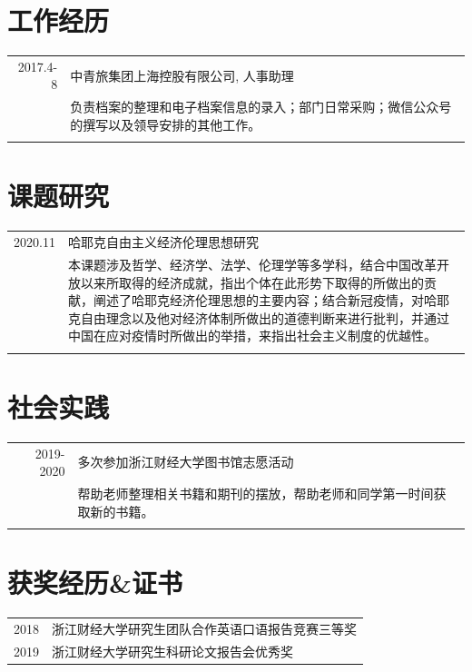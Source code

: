 \documentclass[a4paper,11pt]{article}
\begin{document}
\section{工作经历}
\begin{tabular}{r|p{11cm}}
 \textsc{2017.4-8} & 中青旅集团上海控股有限公司, 人事助理 \\&负责档案的整理和电子档案信息的录入；部门日常采购；微信公众号的撰写以及领导安排的其他工作。\\\multicolumn{2}{c}{} \\
\end{tabular}

\section{课题研究}
\begin{tabular}{r|p{11cm}}
\textsc{2020.11} & 哈耶克自由主义经济伦理思想研究\\&本课题涉及哲学、经济学、法学、伦理学等多学科，结合中国改革开放以来所取得的经济成就，指出个体在此形势下取得的所做出的贡献，阐述了哈耶克经济伦理思想的主要内容；结合新冠疫情，对哈耶克自由理念以及他对经济体制所做出的道德判断来进行批判，并通过中国在应对疫情时所做出的举措，来指出社会主义制度的优越性。\\\multicolumn{2}{c}{} \\
\end{tabular}

\section{社会实践}
\begin{tabular}{r|p{11cm}}
\textsc{2019-2020} & 多次参加浙江财经大学图书馆志愿活动\\&帮助老师整理相关书籍和期刊的摆放，帮助老师和同学第一时间获取新的书籍。\\\multicolumn{2}{c}{} \\
\end{tabular}

\section{获奖经历\&证书}
\begin{tabular}{rl}
 \textsc{2018}  & 浙江财经大学研究生团队合作英语口语报告竞赛三等奖\\
 \textsc{2019} & 浙江财经大学研究生科研论文报告会优秀奖\\

\end{tabular}
\end{document}
